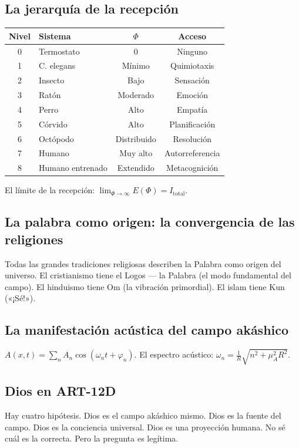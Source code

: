 \documentclass[11pt,a4paper]{article}
\begin{document}
\subsection{La jerarquía de la recepción}
\begin{table}[H]
\centering
\begin{tabular}{@{}clcc@{}}
\toprule
\textbf{Nivel} & \textbf{Sistema} & \textbf{$\Phi$} & \textbf{Acceso} \\ \midrule
0 & Termostato & 0 & Ninguno \\
1 & C. elegans & Mínimo & Quimiotaxis \\
2 & Insecto & Bajo & Sensación \\
3 & Ratón & Moderado & Emoción \\
4 & Perro & Alto & Empatía \\
5 & Córvido & Alto & Planificación \\
6 & Octópodo & Distribuido & Resolución \\
7 & Humano & Muy alto & Autorreferencia \\
8 & Humano entrenado & Extendido & Metacognición \\ \bottomrule
\end{tabular}
\end{table}
El límite de la recepción: $\lim_{\Phi \rightarrow \infty} E(\Phi) = I_{\text{total}}$.

\subsection{La palabra como origen: la convergencia de las religiones}
Todas las grandes tradiciones religiosas describen la Palabra como origen del universo. El cristianismo tiene el Logos --- la Palabra (el modo fundamental del campo). El hinduismo tiene Om (la vibración primordial). El islam tiene Kun («¡Sé!»).

\subsection{La manifestación acústica del campo akáshico}
$A(x,t) = \sum_n A_n \cos(\omega_n t + \varphi_n)$. El espectro acústico: $\omega_n = \frac{1}{R} \sqrt{n^2 + \mu_A^2 R^2}$.

\subsection{Dios en ART-12D}
Hay cuatro hipótesis. Dios es el campo akáshico mismo. Dios es la fuente del campo. Dios es la conciencia universal. Dios es una proyección humana. No sé cuál es la correcta. Pero la pregunta es legítima.
\end{document}
